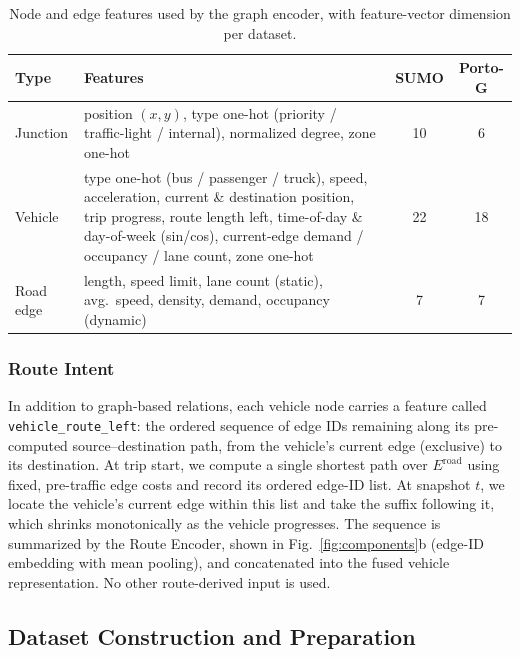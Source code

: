\begin{table}[t]
    \centering
    \caption{Node and edge features used by the graph encoder, with feature-vector dimension per dataset.}\label{tab:node-edge-features}
    \begin{tabular}{@{}lp{6cm}cc@{}}
        \toprule
        \textbf{Type} & \textbf{Features} & \textbf{SUMO} & \textbf{Porto-G} \\
        \midrule
        Junction  & position $(x,y)$, type one-hot (priority / traffic-light / internal), normalized degree, zone one-hot & 10 & 6 \\
        Vehicle   & type one-hot (bus / passenger / truck), speed, acceleration, current \& destination position, trip progress, route length left, time-of-day \& day-of-week (sin/cos), current-edge demand / occupancy / lane count, zone one-hot & 22 & 18 \\
        Road edge & length, speed limit, lane count (static), avg.\ speed, density, demand, occupancy (dynamic) & 7 & 7 \\
        \bottomrule
    \end{tabular}
\end{table}

\subsubsection{Route Intent}
In addition to graph-based relations, each vehicle node carries a feature called \texttt{vehicle\_route\_left}: the ordered sequence of edge IDs remaining along its pre-computed source--destination path, from the vehicle's current edge (exclusive) to its destination. At trip start, we compute a single shortest path over $E^{\mathrm{road}}$ using fixed, pre-traffic edge costs and record its ordered edge-ID list. At snapshot $t$, we locate the vehicle's current edge within this list and take the suffix following it, which shrinks monotonically as the vehicle progresses. The sequence is summarized by the Route Encoder, shown in Fig.~\ref{fig:components}b (edge-ID embedding with mean pooling), and concatenated into the fused vehicle representation. No other route-derived input is used.

\subsection{Dataset Construction and Preparation}\label{sec:porto-conversion}

